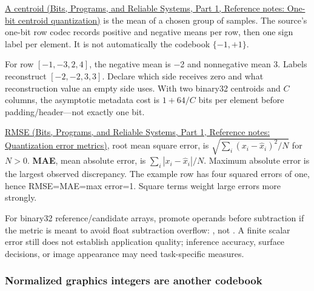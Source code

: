\hypertarget{05-engine-i-ch001-a-one-bit-label-can-select-two-learned-reconstruction-values}{}

\href{../01-Bits-Programs-and-Reliable-Systems-P01/main.pdf\#appendix-4ccd7a775813}{A centroid (Bits, Programs, and Reliable Systems, Part 1, Reference notes: One-bit centroid quantization)} is the mean of a chosen group of samples. The source's one-bit row codec records positive and negative means per row, then one sign label per element. It is not automatically the codebook \(\{-1,+1\}\).

For row \([-1,-3,2,4]\), the negative mean is −2 and nonnegative mean 3. Labels  reconstruct \([-2,-2,3,3]\). Declare which side receives zero and what reconstruction value an empty side uses. With two binary32 centroids and \(C\) columns, the asymptotic metadata cost is \(1+64/C\) bits per element before padding/header---not exactly one bit.

\href{../01-Bits-Programs-and-Reliable-Systems-P01/main.pdf\#appendix-537171d69d27}{RMSE (Bits, Programs, and Reliable Systems, Part 1, Reference notes: Quantization error metrics)}, root mean square error, is \(\sqrt{\sum_i(x_i-\widehat x_i)^2/N}\) for \(N>0\). \textbf{MAE}, mean absolute error, is \(\sum_i|x_i-\widehat x_i|/N\). Maximum absolute error is the largest observed discrepancy. The example row has four squared errors of one, hence RMSE=MAE=max error=1. Square terms weight large errors more strongly.

For binary32 reference/candidate arrays, promote operands before subtraction if the metric is meant to avoid float subtraction overflow: , not . A finite scalar error still does not establish application quality; inference accuracy, surface decisions, or image appearance may need task-specific measures.

\subsubsection{Normalized graphics integers are another codebook}\label{05-engine-i-ch001-normalized-graphics-integers-are-another-codebook}

\hypertarget{05-engine-i-ch001-normalized-graphics-integers-are-another-codebook}{}

